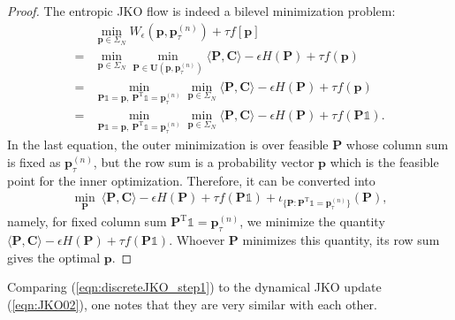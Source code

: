 \documentclass[11pt]{book}
\begin{document}
\begin{proof}
    The entropic JKO flow is indeed a bilevel minimization problem:
    \begin{align*}
        &\min_{\mathbf{p}\in\Sigma_N} W_{\epsilon}(\mathbf{p},\mathbf{p}_{\tau}^{(n)}) + \tau f[\mathbf{p}] \\
        =& \min_{\mathbf{p}\in\Sigma_N} \min_{\mathbf{P}\in \mathbf{U}(\mathbf{p},\mathbf{p}_{\tau}^{(n)})} \langle \mathbf{P}, \mathbf{C} \rangle - \epsilon H(\mathbf{P}) + \tau f(\mathbf{p}) \\
        = & \min_{\mathbf{P}\mathbb{1}=\mathbf{p},\ \mathbf{P}^{\text{T}}\mathbb{1}=\mathbf{p}_{\tau}^{(n)}} \min_{\mathbf{p}\in\Sigma_N}  \langle \mathbf{P}, \mathbf{C} \rangle - \epsilon H(\mathbf{P}) + \tau f(\mathbf{p}) \\
        = & \min_{\mathbf{P}\mathbb{1}=\mathbf{p},\ \mathbf{P}^{\text{T}}\mathbb{1}=\mathbf{p}_{\tau}^{(n)}} \min_{\mathbf{p}\in\Sigma_N}  \langle \mathbf{P}, \mathbf{C} \rangle - \epsilon H(\mathbf{P}) + \tau f(\mathbf{P}\mathbb{1}).
    \end{align*}
    In the last equation, the outer minimization is over feasible $\mathbf{P}$ whose column sum is fixed as $\mathbf{p}_{\tau}^{(n)}$, but the row sum is a probability vector $\mathbf{p}$ which is the feasible point for the inner optimization. Therefore, it can be converted into 
    \begin{align*}
    \min_{\mathbf{P}} \ \langle \mathbf{P}, \mathbf{C} \rangle - \epsilon H(\mathbf{P}) + \tau f(\mathbf{P}\mathbb{1}) + \iota_{\{\mathbf{P}:\mathbf{P}^{\text{T}}\mathbb{1}=\mathbf{p}_{\tau}^{(n)}\}}(\mathbf{P}),
    \end{align*}
    namely, for fixed column sum $\mathbf{P}^{\text{T}}\mathbb{1} = \mathbf{p}_{\tau}^{(n)}$, we minimize the quantity $\langle \mathbf{P}, \mathbf{C} \rangle - \epsilon H(\mathbf{P}) + \tau f(\mathbf{P}\mathbb{1})$. Whoever $\mathbf{P}$ minimizes this quantity, its row sum gives the optimal $\mathbf{p}$.
\end{proof}

Comparing (\ref{eqn:discreteJKO_step1}) to the dynamical JKO update (\ref{eqn:JKO02}), one notes that they are very similar with each other.
\end{document}
